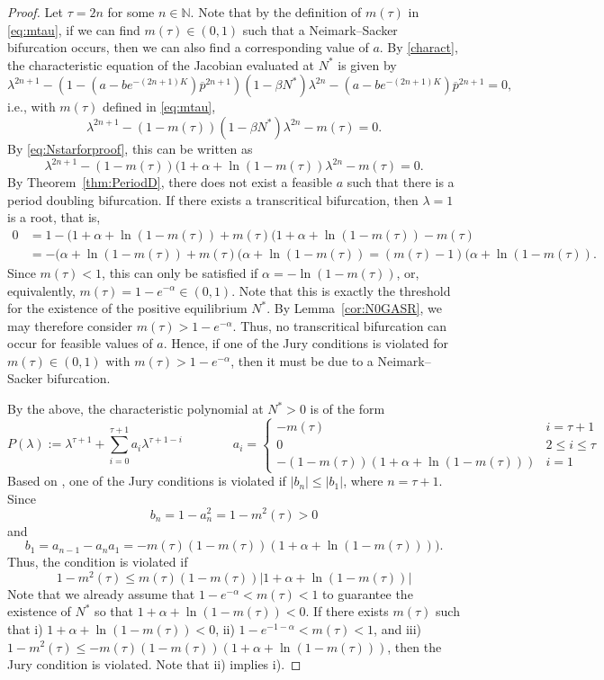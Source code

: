 \documentclass{article}
\numberwithin{theorem}{section}
\begin{document}
{\begin{proof}
Let $\tau=2n$ for some $n\in \mathbb{N}$. Note that by the definition of $m(\tau)$ in \eqref{eq:mtau}, if we can find $m(\tau)\in (0,1)$ such that a Neimark--Sacker bifurcation occurs, then we can also find a corresponding value of $a$. 
    By \eqref{charact}, the characteristic equation of the Jacobian evaluated at $N^*$ is given by 
    $$\lambda^{2n+1} - (1-\left(a - b e^{-(2n+1)K}\right)
\overline{p}^{2n+1})(1-\beta  N^*) \lambda^{2n} -\left(a - b e^{-(2n+1)K}\right)
\overline{p}^{2n+1}=0,$$
i.e., with $m(\tau)$ defined in \eqref{eq:mtau}, 
$$\lambda^{2n+1} - (1-m(\tau))(1-\beta  N^*) \lambda^{2n} -m(\tau)=0.$$
By \eqref{eq:Nstarforproof}, this can be written as 
$$\lambda^{2n+1} - (1-m(\tau))(1+\alpha + \ln(1-m(\tau)) \lambda^{2n} -m(\tau)=0.$$
By Theorem~\ref{thm:PeriodD}, there does not exist a feasible $a$ such that there is a period doubling bifurcation. If there exists a transcritical bifurcation, then $\lambda=1$ is a root, that is, 
\begin{align*}
0&=1- 
(1+\alpha + \ln(1-m(\tau))  
+m(\tau)(1+\alpha + \ln(1-m(\tau))  
-m(\tau)\\&=- 
(\alpha + \ln(1-m(\tau))  
+m(\tau)(\alpha + \ln(1-m(\tau)) = (m(\tau)-1)(\alpha + \ln(1-m(\tau)).
\end{align*}
Since $m(\tau)<1$, this can only be satisfied if $\alpha=-\ln(1-m(\tau))$, or, equivalently, $m(\tau)=1-e^{-\alpha}\in (0,1)$. Note that this is exactly the threshold for the existence of the positive equilibrium $N^*$. By Lemma~\ref{cor:N0GASR}, we may therefore consider $m(\tau)>1-e^{-\alpha}$. Thus, no transcritical bifurcation can occur for feasible values of $a$. 
Hence, if one of the Jury conditions is violated for $m(\tau)\in (0,1)$ with $m(\tau)>1-e^{-\alpha}$, then it must be due to a Neimark--Sacker bifurcation.

By the above, the characteristic polynomial at $N^*>0$ is of the form 
$$P(\lambda):=\lambda^{\tau+1}+\sum_{i=0}^{\tau+1}a_i\lambda^{\tau+1-i}\qquad \qquad a_i=\begin{cases}
-m(\tau) & i=\tau+1\\
0 & 2\leq i \leq \tau\\
-(1-m(\tau))(1+\alpha+\ln(1-m(\tau)))& i=1
\end{cases}
$$
Based on \cite[p.~59]{Keshet}, one of the Jury conditions is violated if $|b_n|\leq |b_1|$, where $n=\tau+1$. Since  
$$b_n=1-a_n^2=1-m^2(\tau)>0$$
and 
$$b_1=a_{n-1}-a_na_1=-m(\tau)(1-m(\tau))(1+\alpha+\ln(1-m(\tau)))).$$
Thus, the condition is violated if 
$$1-m^2(\tau)\leq m(\tau)(1-m(\tau))|1+\alpha+\ln(1-m(\tau))|$$
Note that we already assume that $1-e^{-\alpha}<m(\tau)<1$ to guarantee the existence of $N^*$ so that $1+\alpha+\ln(1-m(\tau))<0$. If there exists $m(\tau)$ such that i) $1+\alpha+\ln(1-m(\tau))<0$, ii) $1-e^{-1-\alpha}<m(\tau)<1$,
and iii)
$1-m^2(\tau)\leq -m(\tau)(1-m(\tau))(1+\alpha+\ln(1-m(\tau)))$, then the Jury condition is violated. Note that ii) implies i). 


\end{proof}}
\end{document}
